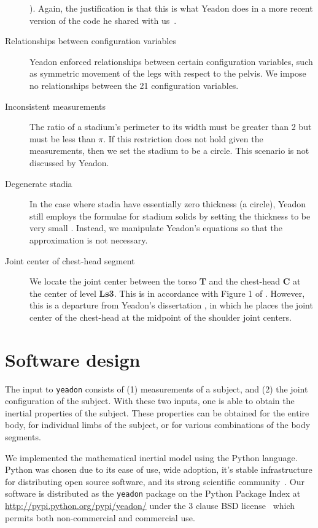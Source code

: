 \documentclass[10pt]{article}
\begin{document}
\begin{description}
        \cite{Yeadon1984a}). Again, the justification is that this is what
        Yeadon does in a more recent version of the code he shared with
        us~\cite{Yeadon2011}.
    \item[Relationships between configuration variables] Yeadon enforced
        relationships between certain configuration variables, such as
        symmetric movement of the legs with respect to the pelvis. We impose no
        relationships between the 21 configuration variables.
    \item[Inconsistent measurements] The ratio of a stadium's perimeter to its
        width must be greater than 2 but must be less than $\pi$. If this
        restriction does not hold given the measurements, then we set the
        stadium to be a circle. This scenario is not discussed by Yeadon.
    \item[Degenerate stadia] In the case where stadia have essentially zero
        thickness (a circle), Yeadon still employs the formulae for stadium
        solids by setting the thickness to be very small \cite{Yeadon1990f}.
        Instead, we manipulate Yeadon's equations so that the approximation is
        not necessary.
    \item[Joint center of chest-head segment] We locate the joint center
        between the torso \textbf{T} and the chest-head \textbf{C} at the
        center of level \textbf{Ls3}. This is in accordance with Figure 1 of
        \cite{Yeadon1990e}. However, this is a departure from Yeadon's
        dissertation \cite{Yeadon1984a}, in which he places the joint center of
        the chest-head at the midpoint of the shoulder joint centers.
\end{description}

\section*{Software design}

The input to \verb+yeadon+ consists of (1) measurements of a subject, and (2)
the joint configuration of the subject. With these two inputs, one is able to
obtain the inertial properties of the subject. These properties can be obtained
for the entire body, for individual limbs of the subject, or for various
combinations of the body segments.

We implemented the mathematical inertial model using the Python language.
Python was chosen due to its ease of use, wide adoption, it's stable
infrastructure for distributing open source software, and its strong scientific
community~\cite{SciPy2014}. Our software is distributed as the \verb+yeadon+
package on the Python Package Index at
\url{http://pypi.python.org/pypi/yeadon/} under the 3 clause BSD
license~\cite{BSD2014} which permits both non-commercial and commercial use.
\end{document}
